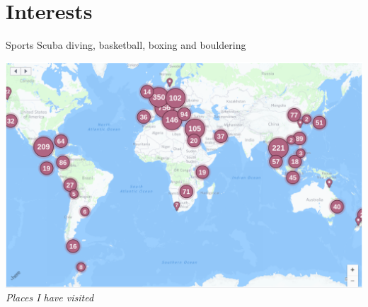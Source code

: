 \documentclass{tccv}
\begin{document}

      




\section{Interests}

\begin{factlist}
\item{Sports} {Scuba diving, basketball, boxing and bouldering}
\end{factlist}

\FloatBarrier
  \centering
  \includegraphics[scale = 0.2]{places_I_have_been_2.png}
  \textit{Places I have visited}
\FloatBarrier
\end{document}
